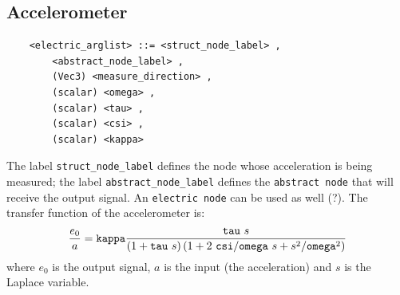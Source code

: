 \subsection{Accelerometer}
  \begin{verbatim}
    <electric_arglist> ::= <struct_node_label> ,
        <abstract_node_label> ,
        (Vec3) <measure_direction> ,
        (scalar) <omega> ,
        (scalar) <tau> ,
        (scalar) <csi> ,
        (scalar) <kappa>	
  \end{verbatim}
  The label \texttt{struct\_node\_label} defines the node whose acceleration 
  is being measured; the label \texttt{abstract\_node\_label} defines the
  \texttt{abstract node} that will receive the output signal. 
  An \texttt{electric node} can be used as well (?).
  The transfer function of the accelerometer is:
  \begin{displaymath}
    \frac{e_0}{a} = \texttt{kappa}\frac{\texttt{tau} \ s}{
      \left( 1+\texttt{tau} \ s \right)
      \left( 1+2 \ \texttt{csi}/\texttt{omega} \ s+s^2/\texttt{omega}^2 \right)
    }
  \end{displaymath}
  where $ e_0 $ is the output signal, $ a $ is the input (the acceleration)
  and $ s $ is the Laplace variable.

